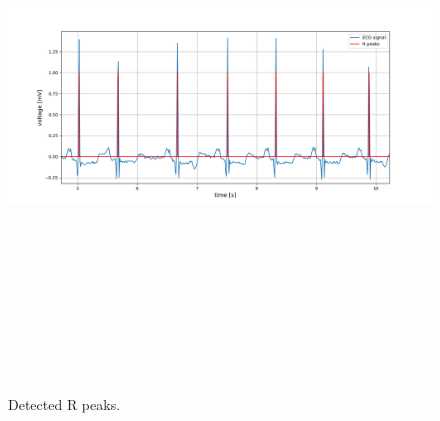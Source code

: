 \begin{figure}[htpb]
	\centering
	\includegraphics[width=15cm,height=15cm,keepaspectratio=true]{images/r_peaks}
	\caption{
		Detected R peaks.
	}
	\label{fig:r_peaks}
\end{figure}


